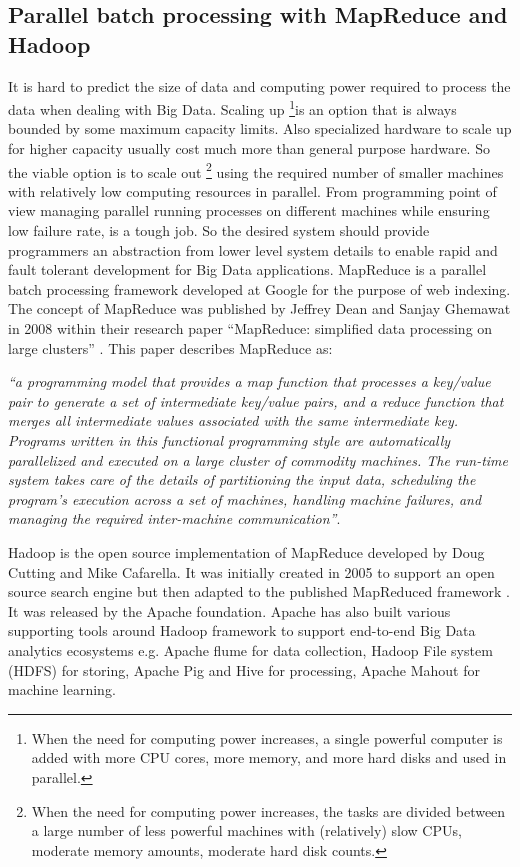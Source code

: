 \subsection{Parallel batch processing with MapReduce and Hadoop} \label{mapr} 
It is hard to predict the size of data and computing power required to process the data when dealing with Big Data. Scaling up  \footnote{When the need for computing power increases, a single powerful computer is added with more CPU cores, more memory, and more hard disks and used in parallel.}is an option that is always bounded by some maximum capacity limits. Also specialized hardware to scale up for higher capacity usually cost much more than general purpose hardware. So the viable option is to scale out \footnote{When the need for computing power increases, the tasks are divided between a large number of less powerful machines with (relatively) slow CPUs, moderate memory amounts, moderate hard disk counts.} using the required number of smaller machines with relatively low computing resources in parallel. From programming point of view managing parallel running processes on different machines while ensuring low failure rate, is a tough job. So the desired system should provide programmers an abstraction from lower level system details to enable rapid and fault tolerant development for Big Data applications.  MapReduce is a parallel batch processing framework developed at Google for the purpose of web indexing. The concept of MapReduce was published by Jeffrey Dean and Sanjay Ghemawat in 2008 within their research paper ``MapReduce: simplified data processing on large clusters''  \cite{dean2008mapreduce}. This paper describes MapReduce as: 

\emph{``a programming model that provides a map function that processes a key/value pair to generate a set of intermediate key/value pairs, and a reduce function that merges all intermediate values associated with the same intermediate key. Programs written in this functional programming style are automatically parallelized and executed on a large cluster of commodity machines. The run-time system takes care of the details of partitioning the input data, scheduling the program's execution across a set of machines, handling machine failures, and managing the required inter-machine communication''}.

Hadoop is the open source implementation of MapReduce developed by Doug Cutting and Mike Cafarella. It was initially created in 2005 to support an open source search engine but then adapted to the published MapReduced framework \cite{dean2008mapreduce}. It was released by the Apache foundation. Apache has also built various supporting tools around Hadoop framework to support end-to-end Big Data analytics ecosystems e.g. Apache flume for data collection, Hadoop File system (HDFS) for storing, Apache Pig and Hive for processing, Apache Mahout for machine learning.  

